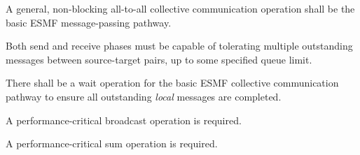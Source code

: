 














A general, non-blocking all-to-all collective communication operation
shall be the basic ESMF message-passing pathway.


Both send and receive phases must be capable of tolerating multiple
outstanding messages between source-target pairs, up to some specified
queue limit.


There shall be a wait operation for the basic ESMF collective
communication pathway to ensure all outstanding \emph{local} messages
are completed.


A performance-critical broadcast operation is required.


A performance-critical sum operation is required.


